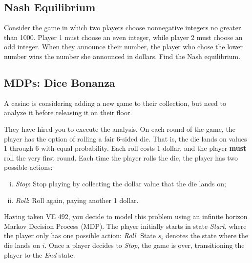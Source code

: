 \documentclass[11pt, answers]{exam}
\begin{document}
%
%
\begin{questions}
\section{Nash Equilibrium}
\question
Consider the game in which two players choose nonnegative integers no greater than 1000. Player 1 must choose an even integer, while player 2 must choose an odd integer. When they announce their number, the player who chose the lower number wins the number she announced in dollars. Find the Nash equilibrium.
\end{questions}

\newpage

%
%
\begin{questions}
\section{MDPs: Dice Bonanza}
\question
A casino is considering adding a new game to their collection, but need to analyze it before releasing it on their floor. 

They have hired you to execute the analysis. On each round of the game, the player has the option of rolling a fair 6-sided die. That is, the die lands on values 1 through 6 with equal probability. Each roll costs 1 dollar, and the player \textbf{must} roll the very first round. Each time the player rolls the die, the player has two possible actions:
\begin{enumerate}[i.]
\item \textit{Stop}: Stop playing by collecting the dollar value that the die lands on;
\item \textit{Roll}: Roll again, paying another 1 dollar.
\end{enumerate}

Having taken VE 492, you decide to model this problem using an infinite horizon Markov Decision Process (MDP). The player initially starts in state \textit{Start}, where the player only has one possible action: \textit{Roll}. State $s_i$ denotes the state where the die lands on $i$. Once a player decides to \textit{Stop}, the game is over, transitioning the player to the \textit{End} state.

\end{questions}
\end{document}
